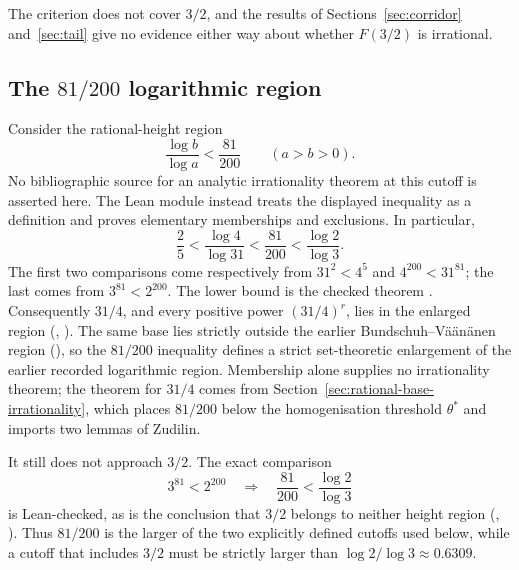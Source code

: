 \documentclass[11pt]{article}
\begin{document}
The criterion does not cover $3/2$, and the results of
Sections~\ref{sec:corridor} and~\ref{sec:tail} give no evidence either way
about whether $F(3/2)$ is irrational.

\subsection{The $81/200$ logarithmic region}

Consider the rational-height region
\[
 \frac{\log b}{\log a}<\frac{81}{200}
 \qquad(a>b>0).
\]
No bibliographic source for an analytic irrationality theorem at this cutoff is
asserted here.  The Lean module instead treats the displayed inequality as a
definition and proves elementary memberships and exclusions.  In particular,
\[
 \frac25
 <\frac{\log4}{\log31}
 <\frac{81}{200}
 <\frac{\log2}{\log3}.
\]
The first two comparisons come respectively from $31^2<4^5$ and
$4^{200}<31^{81}$; the last comes from $3^{81}<2^{200}$.  The lower bound is
the checked theorem
.  Consequently $31/4$, and every positive power $(31/4)^r$, lies
in the enlarged region
(,
).
The same base lies strictly outside the earlier
Bundschuh--V\"a\"an\"anen region
(),
so the $81/200$ inequality defines a strict set-theoretic enlargement of the
earlier recorded logarithmic region.  Membership alone supplies no
irrationality theorem; the theorem for $31/4$ comes from
Section~\ref{sec:rational-base-irrationality}, which places $81/200$ below the
homogenisation threshold $\theta^*$ and imports two lemmas of Zudilin.

It still does not approach $3/2$.  The exact comparison
\[
 3^{81}<2^{200}
 \quad\Longrightarrow\quad
 \frac{81}{200}<\frac{\log2}{\log3}
\]
is Lean-checked, as is the conclusion that $3/2$ belongs to neither height
region
(,
).
Thus $81/200$ is the larger of the two explicitly defined cutoffs used below,
while a cutoff that includes $3/2$ must be strictly larger than
$\log2/\log3\approx0.6309$.
\end{document}
